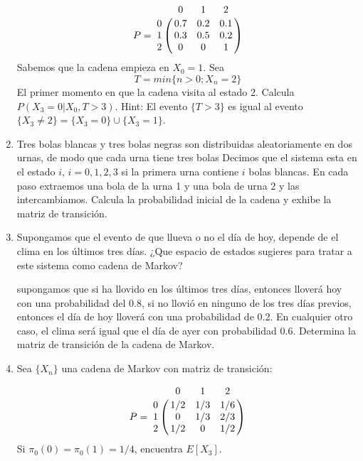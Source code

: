 \documentclass{report}
\begin{document}
\begin{enumerate}
$$
P = \bordermatrix{~ & 0   & 1   & 2 \cr
                  0 & 0.7 & 0.2 & 0.1 \cr
                  1 & 0.3 & 0.5 & 0.2 \cr
                  2 & 0   & 0   & 1 \cr             
                  }
$$
Sabemos que la cadena empieza en $X_0=1$. Sea
$$
T = min\{n>0; X_n =2\}
$$
El primer momento en que la cadena visita al estado 2. Calcula $P(X_3=0\vert X_0, T>3)$.
Hint: El evento $\{T>3\}$ es igual al evento $\{X_3\neq 2\}=\{X_3=0\}\cup\{X_3=1\}$.
\item Tres bolas blancas y tres bolas negras son distribuidas aleatoriamente en dos urnas, de modo que cada urna tiene tres bolas Decimos que el sistema esta en el estado $i$, $i = 0,1,2,3$ si la primera urna contiene $i$ bolas blancas. En cada paso extraemos una bola de la urna 1 y una bola de urna 2 y las intercambiamos. Calcula la probabilidad inicial de la cadena y exhibe la matriz de transición.
\item Supongamos que el evento de que llueva o no el día de hoy, depende de el clima en los últimos tres días. ¿Que espacio de estados sugieres para tratar a este sistema como cadena de Markov?

supongamos que si ha llovido en los últimos tres días, entonces lloverá hoy con una probabilidad del 0.8, si no llovió en ninguno de los tres días previos, entonces el día de hoy lloverá con una probabilidad de 0.2. En cualquier otro caso, el clima será igual que el día de ayer con probabilidad 0.6. Determina la matriz de transición de la cadena de Markov.
\item Sea $\{X_n\}$ una cadena de Markov con matriz de transición:

$$
P = \bordermatrix{~ & 0   & 1   & 2 \cr
                  0 & 1/2 & 1/3 & 1/6 \cr
                  1 & 0   & 1/3 & 2/3 \cr
                  2 & 1/2 & 0   & 1/2 \cr             
                  }
$$
Si $\pi_0(0) = \pi_0(1)=1/4$, encuentra $E[X_3]$.
\end{enumerate}
\end{document}
